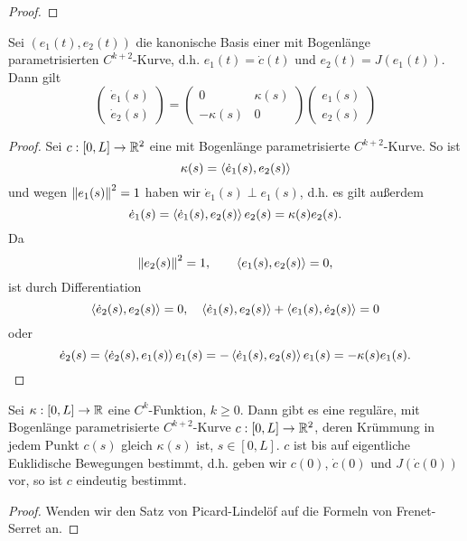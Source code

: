 \documentclass[
pdftex,
oneside,
headsepline,
11pt, 
]{scrreprt}
\begin{document}
\begin{proof}
	
\end{proof}
\begin{bsp}
	
\end{bsp}
\begin{de}[Ordnung]
	
\end{de}
\begin{de}[Krümmungskreis]
	
\end{de}
\begin{lem}
	
\end{lem}
\begin{de}[Evolute]
	
\end{de}
\begin{lem}
	Sei $(e_1(t),e_2(t))$ die kanonische Basis einer mit Bogenlänge parametrisierten $C^{k+2}$-Kurve, d.h. $e_1(t)=\dot{c}(t)$ und $e_2(t)=J(e_1(t))$. Dann gilt \[  \begin{pmatrix}
	\dot{e}_1(s)\\
	\dot{e}_2(s)
	\end{pmatrix}=\begin{pmatrix}
	0 & \kappa(s)\\
	-\kappa(s) & 0
	\end{pmatrix} \begin{pmatrix}
	e_1(s)\\
	e_2(s)
	\end{pmatrix} \]
\end{lem}
\begin{proof}
Sei $c:[0,L]\to \mathbb{R}^2$ eine mit Bogenlänge parametrisierte $C^{k+2}$-Kurve. So ist \[ \kappa(s)=\left\langle \dot{e}_1(s),e_2(s) \right\rangle \] und wegen $\left\lVert e_1(s)\right\rVert^2=1$ haben wir $\dot{e}_1(s)\perp e_1(s)$, d.h. es gilt außerdem \[  \dot{e}_1(s)=\left\langle \dot{e}_1(s),e_2(s) \right\rangle e_2(s)=\kappa(s)e_2(s). \]
Da \[  \left\lVert e_2(s)\right\rVert^2=1,\qquad \left\langle e_1(s),e_2(s) \right\rangle=0, \]
ist durch Differentiation \[ \left\langle \dot{e}_2(s),e_2(s) \right\rangle=0,\quad \left\langle \dot{e}_1(s),e_2(s) \right\rangle+\left\langle e_1(s),\dot{e}_2(s) \right\rangle=0  \] oder 
\[   \dot{e}_2(s)=\left\langle \dot{e}_2(s),e_1(s) \right\rangle e_1(s)=-\left\langle \dot{e}_1(s),e_2(s) \right\rangle e_1(s)=-\kappa(s)e_1(s). \]
\end{proof}
\begin{theo}
Sei $\kappa:[0,L]\to\mathbb{R}$ eine $C^k$-Funktion, $k\geq 0$. Dann gibt es eine reguläre, mit Bogenlänge parametrisierte $C^{k+2}$-Kurve $c:[0,L]\to \mathbb{R}^2$, deren Krümmung in jedem Punkt $c(s)$ gleich $\kappa(s)$ ist, $s\in [0,L]$. $c$ ist bis auf eigentliche Euklidische Bewegungen bestimmt, d.h. geben wir $c(0)$, $\dot{c}(0)$ und $J(\dot{c}(0))$ vor, so ist $c$ eindeutig bestimmt.
\end{theo}
\begin{proof}
Wenden wir den Satz von Picard-Lindelöf auf die Formeln von Frenet-Serret an.
\end{proof}
\end{document}
